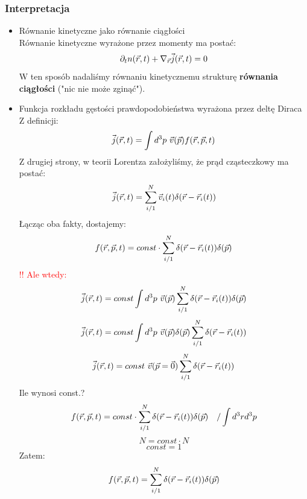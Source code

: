 \subsubsection{Interpretacja}
\begin{itemize}
\item{Równanie kinetyczne jako równanie ciągłości}\\
Równanie kinetyczne wyrażone przez momenty ma postać:
\begin{equation}\partial_t n(\vec{r},t)+\nabla_{\vec{r}}\vec{j}(\vec{r},t)=0\end{equation}
W ten sposób nadaliśmy równaniu kinetycznemu strukturę \textbf{równania ciągłości} ("nic nie może zginąć").
\item{Funkcja rozkładu gęstości prawdopodobieństwa wyrażona przez deltę Diraca}\\
Z definicji:
\begin{equation}\vec{j}(\vec{r},t)=\int d^3 p~\vec{v}(\vec{p})f(\vec{r},\vec{p},t)\end{equation}
Z drugiej strony, w teorii Lorentza założyliśmy, że prąd cząsteczkowy ma postać:
\begin{equation}\vec{j}(\vec{r},t)=\sum_{i/1}^N\vec{v}_i(t)\delta(\vec{r}-\vec{r}_i(t))\end{equation}
Łącząc oba fakty, dostajemy:
\begin{equation}f(\vec{r},\vec{p},t)=const\cdot\sum_{i/1}^N\delta(\vec{r}-\vec{r}_i(t))\delta(\vec{p})
\end{equation}
\textcolor{red}{!! Ale wtedy:
\begin{equation}\vec{j}(\vec{r},t)=const \int d^3p~\vec{v}(\vec{p})\sum_{i/1}^N\delta(\vec{r}-\vec{r}_i(t))\delta(\vec{p})\end{equation}
\begin{equation}\vec{j}(\vec{r},t)= const \int d^3p~\vec{v}(\vec{p}) \delta(\vec{p}) \sum_{i/1}^N\delta(\vec{r}-\vec{r}_i(t))
\end{equation}
\begin{equation}\vec{j}(\vec{r},t)=const~\vec{v}(\vec{p}=\vec{0}) \sum_{i/1}^N\delta(\vec{r}-\vec{r}_i(t))
\end{equation}}
Ile wynosi const.?
\begin{equation}f(\vec{r},\vec{p},t)=const\cdot\sum_{i/1}^N\delta(\vec{r}-\vec{r}_i(t))\delta(\vec{p})~~~/\int d^3rd^3p \nonumber \end{equation}
\begin{equation}N=const\cdot N \nonumber \end{equation}
\begin{equation}const=1 \nonumber \end{equation}
Zatem:
\begin{equation}f(\vec{r},\vec{p},t)=\sum_{i/1}^N\delta(\vec{r}-\vec{r}_i(t))\delta(\vec{p}) \end{equation}

\end{itemize}
